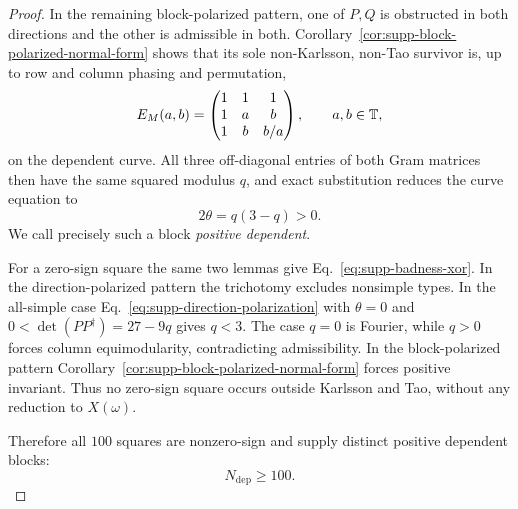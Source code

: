 \begin{proof}
In the remaining block-polarized pattern, one of $P,Q$ is {obstructed in both directions and the other is admissible in both}. Corollary~\ref{cor:supp-block-polarized-normal-form} shows that its sole non-Karlsson, non-Tao survivor is, up to row and column phasing and permutation,
\begin{equation}
E_M(a,b)=
\begin{pmatrix}1&1&1\\1&a&b\\1&b&b/a\end{pmatrix},
\qquad a,b\in\mathbb T,
\label{eq:supp-dependent-normal-form}
\end{equation}
on the dependent curve.  All three off-diagonal entries of both Gram matrices then have the same squared modulus $q$, and exact substitution reduces the curve equation to
\begin{equation}
2\theta=q(3-q)>0.
\label{eq:supp-dependent-weight}
\end{equation}
We call precisely such a block \emph{positive dependent}.

{For a zero-sign square the same two lemmas give Eq.~\eqref{eq:supp-badness-xor}.  In the direction-polarized pattern the trichotomy excludes nonsimple types. In the all-simple case Eq.~\eqref{eq:supp-direction-polarization} with $\theta=0$ and $0<\det(PP^\dagger)=27-9q$ gives $q<3$. The case $q=0$ is Fourier, while $q>0$ forces column equimodularity, contradicting admissibility. In the block-polarized pattern Corollary~\ref{cor:supp-block-polarized-normal-form} forces positive invariant.  Thus no zero-sign square occurs outside Karlsson and Tao, without any reduction to $X(\omega)$.}

{Therefore all $100$ squares are nonzero-sign and supply distinct positive dependent blocks:}
\begin{equation}
N_{\mathrm{dep}}\ge100.
\label{eq:supp-dependent-lower}
\end{equation}


\end{proof}
